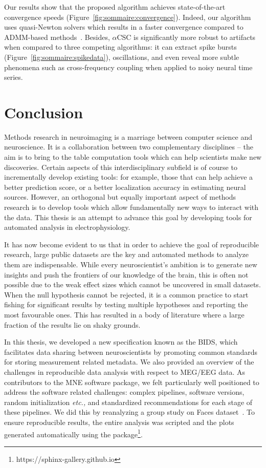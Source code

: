 Our results
show that the proposed algorithm achieves state-of-the-art convergence speeds (Figure~\ref{fig:sommaire:convergence}). Indeed, our algorithm uses quasi-Newton solvers which results in a faster convergence compared to ADMM-based methods~\citep{heide2015fast, wohlberg2016efficient}. Besides, $\alpha$CSC is
significantly more robust to artifacts when compared to three competing algorithms: it can extract
spike bursts (Figure~\ref{fig:sommaire:spikedata}), oscillations, and even reveal more subtle phenomena such as cross-frequency coupling
when applied to noisy neural time series.

\section*{Conclusion}

Methods research in neuroimaging is a marriage between computer science and neuroscience. It is a collaboration between two complementary disciplines -- the aim is to bring to the table computation tools which can help scientists make new discoveries. Certain aspects of this interdisciplinary subfield is of course to incrementally develop existing tools: for example, those that can help achieve a better prediction score, or a better localization accuracy in estimating neural sources. However, an orthogonal but equally important aspect of methods research is to develop tools which allow fundamentally new ways to interact with the data. This thesis is an attempt to advance this goal by developing tools for automated analysis in electrophysiology.

It has now become evident to us that in order to achieve the goal of reproducible research, large public datasets are the key and automated methods to analyze them are indispensable. While every neuroscientist's ambition is to generate new insights and push the frontiers of our knowledge of the brain, this is often not possible due to the weak effect sizes which cannot be uncovered in small datasets. When the null hypothesis cannot be rejected, it is a common practice to start fishing for significant results by testing multiple hypotheses and reporting the most favourable ones. This has resulted in a body of literature where a large fraction of the results lie on shaky grounds. 

In this thesis, we developed a new specification known as the \ac{BIDS}, which facilitates data sharing between neuroscientists by promoting common standards for storing measurement related metadata. We also provided an overview of the challenges in reproducible data analysis with respect to \ac{MEG}/\ac{EEG} data. As contributors to the MNE software package, we felt particularly well positioned to address  the software related challenges: complex pipelines, software versions, random initialization \emph{etc.,} and standardized recommendations for each stage of these pipelines. We did this by reanalyzing a group study on Faces dataset~\citep{wakeman2015multi}. To ensure reproducible results, the entire analysis was scripted and the plots generated automatically using the  package\footnote{https://sphinx-gallery.github.io}.

